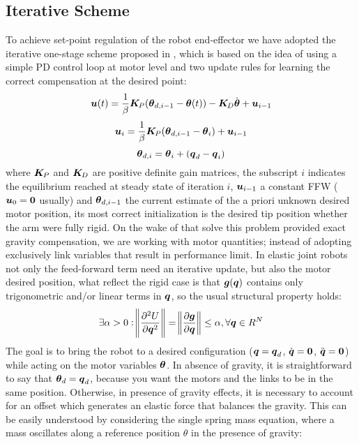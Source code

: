 \subsection{Iterative Scheme}
To achieve set-point regulation of the robot end-effector we have adopted the iterative one-stage scheme proposed in \cite{deluca96}, which is based on the idea of using a simple PD control loop at motor level and two update rules for learning the correct compensation at the desired point:
\begin{equation}\label{eq:clow}
    \boldsymbol{u}(t) = \frac{1}{\beta}\boldsymbol{K}_{\!P}(\boldsymbol{\theta}_{d,i-1}-\boldsymbol{\theta}(t))-\boldsymbol{K}_{\!D}\dot{\boldsymbol{\theta}}+\boldsymbol{u}_{i-1}
\end{equation}
\begin{equation}\label{eq:u_up}
    \boldsymbol{u}_i = \frac{1}{\beta}\boldsymbol{K}_{\!P}(\boldsymbol{\theta}_{d,i-1}-\boldsymbol{\theta}_i) + \boldsymbol{u}_{i-1}
\end{equation}
\begin{equation}\label{eq:mot_up}
    \boldsymbol{\theta}_{d,i} = \boldsymbol{\theta}_i + ({\boldsymbol{q}}_d - {\boldsymbol{q}}_i)
\end{equation}
where $\boldsymbol{K}_{\!P}$ and $\boldsymbol{K}_{\!D}$ are positive definite gain matrices, the subscript $i$ indicates the equilibrium reached at steady state of iteration $i$, $\boldsymbol{u}_{i-1}$ a constant FFW ($\boldsymbol{u}_0=\boldsymbol{0}$ usually) and $\boldsymbol{\theta}_{d,i-1}$ the current estimate of the a priori unknown desired motor position, its most correct initialization is the desired tip position whether the arm were fully rigid. On the wake of \cite{simplepd,13sic} that solve this problem provided exact gravity compensation, we are working with motor quantities; instead of adopting exclusively link variables that result in performance limit. In elastic joint robots not only the feed-forward term need an iterative update, but also the motor desired position, what reflect the rigid case is that $\boldsymbol{g}({\boldsymbol{q}})$ contains only trigonometric and/or linear terms in ${\boldsymbol{q}}$, so the usual structural property holds:
\begin{equation}\label{eq:stprop}
    \exists \alpha>0: \norm{\frac{\partial^2U}{\partial {\boldsymbol{q}}^2}}=\norm{\frac{\partial \boldsymbol{g}}{\partial {\boldsymbol{q}}}} \leq \alpha, \forall {\boldsymbol{q}} \in R^N
\end{equation}
The goal is to bring the robot to a desired configuration (\({\boldsymbol{q}}={\boldsymbol{q}}_d\), \(\dot{\boldsymbol{q}} = \boldsymbol{0}\), \(\ddot{\boldsymbol{q}} = \boldsymbol{0}\)) while acting on the motor variables \(\boldsymbol{\theta}\). In absence of gravity, it is straightforward to say that \(\boldsymbol{\theta}_d = {\boldsymbol{q}}_d\), because you want the motors and the links to be in the same position. Otherwise, in presence of gravity effects, it is necessary to account for an offset which generates an elastic force that balances the gravity. This can be easily understood by considering the single spring mass equation, where a mass oscillates along a reference position \(\theta\) in the presence of gravity:
